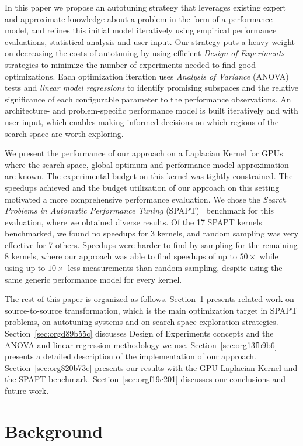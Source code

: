 \documentclass[conference]{IEEEtran}
\begin{document}
In this paper we propose an autotuning strategy that leverages existing expert
and approximate knowledge about a problem in the form of a performance model,
and refines this initial model iteratively using empirical performance
evaluations, statistical analysis and user input. Our strategy puts a heavy
weight on decreasing the costs of autotuning by using efficient \emph{Design of
Experiments} strategies to minimize the number of experiments needed to find
good optimizations. Each optimization iteration uses \emph{Analysis of Variance}
(ANOVA) tests and \emph{linear model regressions} to identify promising subspaces and
the relative significance of each configurable parameter to the performance
observations. An architecture- and problem-specific performance model is built
iteratively and with user input, which enables making informed decisions on
which regions of the search space are worth exploring.

We present the performance of our approach on a Laplacian Kernel for GPUs where
the search space, global optimum and performance model approximation are known.
The experimental budget on this kernel was tightly constrained. The speedups
achieved and the budget utilization of our approach on this setting motivated a
more comprehensive performance evaluation. We chose the \emph{Search Problems in
Automatic Performance Tuning} (SPAPT)~\cite{balaprakash2012spapt}
benchmark for this evaluation, where we obtained diverse results. Of the 17
SPAPT kernels benchmarked, we found no speedups for 3 kernels, and random
sampling was very effective for 7 others. Speedups were harder to find by
sampling for the remaining 8 kernels, where our approach was able to find
speedups of up to \(50\times\) while using up to \(10\times\) less measurements than
random sampling, despite using the same generic performance model for every
kernel.

The rest of this paper is organized as follows. Section~\ref{sec:orgd392ccc}
presents related work on source-to-source transformation, which is the main
optimization target in SPAPT problems, on autotuning systems and on search space
exploration strategies. Section~\ref{sec:orgd89b55c} discusses Design of
Experiments concepts and the ANOVA and linear regression methodology we use.
Section~\ref{sec:org13fb9b6} presents a detailed
description of the implementation of our approach. Section~\ref{sec:org820b73e} presents our results with the GPU Laplacian Kernel and the SPAPT
benchmark. Section~\ref{sec:orgf19c201} discusses our conclusions and future work.
\section{Background}
\label{sec:orgd392ccc}
\end{document}
